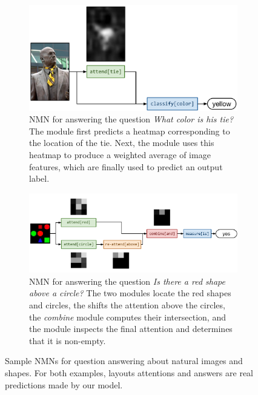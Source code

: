 \begin{figure}
  \begin{subfigure}[t]{0.4\textwidth}
    \includegraphics[width=\textwidth]{fig/full1}
    \caption{NMN for answering the question \emph{What color is
    his tie?} The  module first predicts a heatmap
    corresponding to the location of the tie. Next, the 
    module uses this heatmap to produce a weighted average of image features,
  which are finally used to predict an output label.}
  \end{subfigure}
  \hfill
  \begin{subfigure}[t]{0.55\textwidth}
    \includegraphics[width=\textwidth]{fig/full2}
    \caption{NMN for answering the question \emph{Is there a red shape above a
    circle?} The two  modules locate the red shapes and circles,
    the  shifts the attention above the circles, the
    \emph{combine} module computes their intersection, and the
     module inspects the final attention and determines
  that it is non-empty.}
  \label{fig:shape-nmn}
  \end{subfigure}
  \caption{Sample NMNs for question answering about natural images and shapes.
  For both examples, layouts attentions and answers are real predictions made by
  our model.}
  \label{fig:nmns}
\end{figure}


